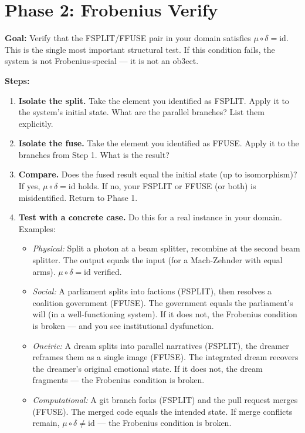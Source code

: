 \documentclass[12pt,a4paper]{article}
\begin{document}
\section{Phase 2: Frobenius Verify}

{\bf Goal:} Verify that the FSPLIT/FFUSE pair in your domain satisfies
$\mu \circ \delta = \mathrm{id}$. This is the single most important structural test.
If this condition fails, the system is not Frobenius-special — it is not an ob3ect.

{\bf Steps:}

\begin{enumerate}[label=\textbf{2.\arabic*.}, leftmargin=2em]
\item \textbf{Isolate the split.} Take the element you identified as FSPLIT. Apply it
    to the system's initial state. What are the parallel branches? List them explicitly.

\item \textbf{Isolate the fuse.} Take the element you identified as FFUSE. Apply it to
    the branches from Step 1. What is the result?

\item \textbf{Compare.} Does the fused result equal the initial state (up to isomorphism)?
    If yes, $\mu \circ \delta = \mathrm{id}$ holds. If no, your FSPLIT or FFUSE (or both)
    is misidentified. Return to Phase 1.

\item \textbf{Test with a concrete case.} Do this for a real instance in your domain.
    Examples:
    \begin{itemize}
    \item {\it Physical:} Split a photon at a beam splitter, recombine at the second
        beam splitter. The output equals the input (for a Mach-Zehnder with equal arms).
        $\mu \circ \delta = \mathrm{id}$ verified.
    \item {\it Social:} A parliament splits into factions (FSPLIT), then resolves a
        coalition government (FFUSE). The government equals the parliament's will
        (in a well-functioning system). If it does not, the Frobenius condition is
        broken — and you see institutional dysfunction.
    \item {\it Oneiric:} A dream splits into parallel narratives (FSPLIT), the dreamer
        reframes them as a single image (FFUSE). The integrated dream recovers the
        dreamer's original emotional state. If it does not, the dream fragments —
        the Frobenius condition is broken.
    \item {\it Computational:} A git branch forks (FSPLIT) and the pull request merges
        (FFUSE). The merged code equals the intended state. If merge conflicts remain,
        $\mu \circ \delta \neq \mathrm{id}$ — the Frobenius condition is broken.
    \end{itemize}


\end{enumerate}
\end{document}
